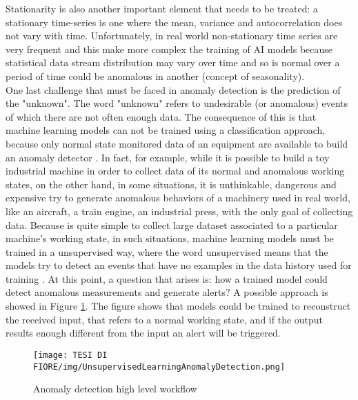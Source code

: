 Stationarity is also another important element that needs to be treated: a stationary time-series is one where the mean, variance and autocorrelation does not vary with time. Unfortunately, in real world non-stationary time series are very frequent and this make more complex the training of AI models because statistical data stream distribution may vary over time and so is normal over a period of time could be anomalous in another (concept of seasonality).\\
One last challenge that must be faced in anomaly detection is the prediction of the "unknown". The word "unknown" refers to undesirable (or anomalous) events of which there are not often enough data. The consequence of this is that machine learning models can not be trained using a classification approach, because only normal state monitored data of an equipment are available to build an anomaly detector \cite{7AnomalyDetectionUnsupervised}. In fact, for example, while it is possible to build a toy industrial machine in order to collect data of its normal and anomalous working states, on the other hand, in some situations, it is unthinkable, dangerous and expensive try to generate anomalous behaviors of a machinery used in real world, like an aircraft, a train engine, an industrial press, with the only goal of collecting data. Because is quite simple to collect large dataset associated to a particular machine's working state, in such situations, machine learning models must be trained in a unsupervised way, where the word unsupervised means that the models try to detect an events that have no examples in the data history used for training \cite{8AnomalyDetectionUnsupervised2}. At this point, a question that arises is: how a trained model could detect anomalous measurements and generate alerts? A possible approach is showed in Figure \ref{scoring_system_approach}. The figure shows that models could be trained to reconstruct the received input, that refers to a normal working state, and if the output results enough different from the input an alert will be triggered.

\begin{figure}[ht]
\texttt{[image: TESI DI FIORE/img/UnsupervisedLearningAnomalyDetection.png]}
\centering
\caption{Anomaly detection high level workflow \cite{7AnomalyDetectionUnsupervised}}
\label{scoring_system_approach}
\end{figure}

